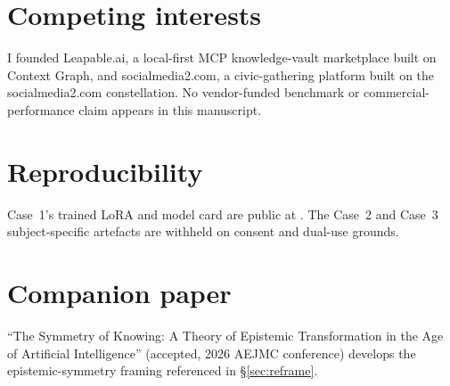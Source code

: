 \documentclass[10pt,twocolumn]{article}
\begin{document}
\section*{Competing interests}
I founded Leapable.ai, a local-first MCP knowledge-vault marketplace built on
Context Graph, and socialmedia2.com, a civic-gathering platform built on the socialmedia2.com
constellation. No vendor-funded benchmark or commercial-performance claim appears
in this manuscript.

\section*{Reproducibility}
Case~1's trained LoRA and model card are public at
. The Case~2 and Case~3
subject-specific artefacts are withheld on consent and dual-use grounds.

\section*{Companion paper}
``The Symmetry of Knowing: A Theory of Epistemic Transformation in the Age of
Artificial Intelligence'' (accepted, 2026 AEJMC conference) develops the
epistemic-symmetry framing referenced in \S\ref{sec:reframe}.



\end{document}
